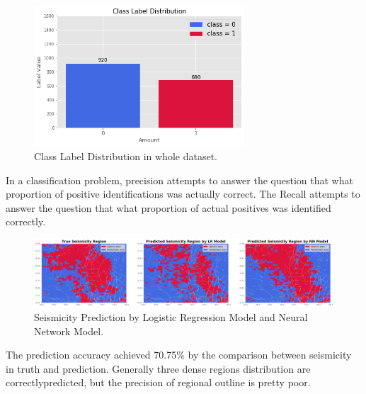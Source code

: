 \documentclass[final-report]{report-template}
\begin{document}
\begin{figure}
    \begin{center}
        \includegraphics[width=0.7\textwidth]{class_label.png}
    \end{center}
    \caption{\label{fig:class_label} Class Label Distribution in whole dataset.}
\end{figure}

In a classification problem, precision attempts to answer the question that what proportion of positive identifications was actually correct. 
The Recall attempts to answer the question that what proportion of actual positives was identified correctly.

\begin{figure}
    \begin{center}
        \includegraphics[width=1\textwidth]{mapping_comparison.png}
    \end{center}
    \caption{\label{fig:logistic_result} Seismicity Prediction by Logistic Regression Model and Neural Network Model.}
\end{figure}

The prediction accuracy achieved 70.75\% by the comparison between seismicity in truth and prediction.
Generally three dense regions distribution are correctlypredicted, but the precision of regional outline is pretty poor.
\end{document}
